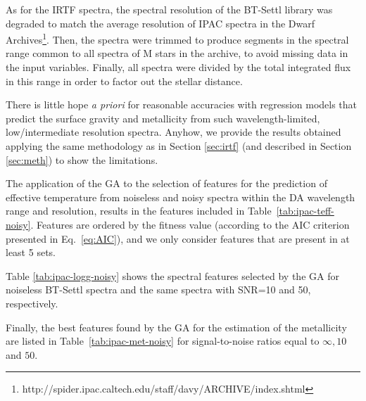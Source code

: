 
As for the IRTF spectra, the spectral resolution of the BT-Settl
library was degraded to match the average resolution of IPAC spectra
in the Dwarf
Archives\footnote{http://spider.ipac.caltech.edu/staff/davy/ARCHIVE/index.shtml}. Then,
the spectra were trimmed to produce segments in the spectral range
common to all spectra of M stars in the archive, to avoid missing data
in the input variables. Finally, all spectra were divided by the total
integrated flux in this range in order to factor out the stellar
distance.

There is little hope {\it a priori} for reasonable accuracies with
regression models that predict the surface gravity and metallicity
from such wavelength-limited, low/intermediate resolution
spectra. Anyhow, we provide the results obtained applying the same
methodology as in Section \ref{sec:irtf} (and described in
Section \ref{sec:meth}) to show the limitations.

The application of the GA to the selection of features for the
prediction of effective temperature from noiseless and noisy spectra within the
DA wavelength range and resolution, results in the features included
in Table~\ref{tab:ipac-teff-noisy}. Features are ordered by the
fitness value (according to the AIC criterion presented in Eq.~\ref{eq:AIC}), 
and we only consider features that are present
in at least 5 sets. 

Table   %
\ref{tab:ipac-logg-noisy}
shows the spectral features selected by the GA for noiseless BT-Settl
spectra and the same spectra with SNR=10 and 50, respectively.

Finally, the best features found by the GA for the estimation of the
metallicity are listed in 
Table~\ref{tab:ipac-met-noisy} for
signal-to-noise ratios equal to $\infty , 10 $ and $ 50 $.


